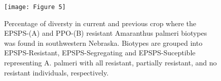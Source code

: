 \documentclass[]{article}
\newcommand{\blandscape}{\begin{landscape}}
\newcommand{\elandscape}{\end{landscape}}
\begin{document}
\newpage

\blandscape

\begin{figure}[h]

{\centering \texttt{[image: Figure 5]} 

}

\caption{Percentage of diversty in current and previous crop where the EPSPS-(A) and PPO-(B) resistant Amaranthus palmeri biotypes was found in southwestern Nebraska. Biotypes are grouped into EPSPS-Resistant, EPSPS-Segregating and EPSPS-Suceptible representing A. palmeri with all resistant, partially resistant, and no resistant individuals, respectively.}\label{fig:unnamed-chunk-5}
\end{figure}

\elandscape
\end{document}
